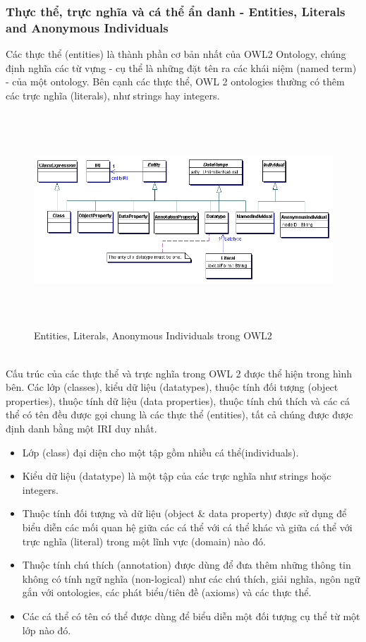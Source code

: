 \subsubsection{Thực thể, trực nghĩa và cá thể ẩn danh - Entities, Literals and Anonymous Individuals}
Các thực thể (entities) là thành phần cơ bản nhất của OWL2 Ontology, chúng định nghĩa các từ vựng - cụ thể là những đặt tên ra các khái niệm (named term) - của một ontology. Bên cạnh các thực thể, OWL 2 ontologies thường có thêm các trực nghĩa (literals), như strings hay integers.
\begin{figure}[ht!]
	\centering
	\includegraphics[width=150mm, height=80mm]{Figures/entities.png}
	\caption{Entities, Literals, Anonymous Individuals trong OWL2 \label{overflow}}
\end{figure}
\\
Cấu trúc của các thực thể và trực nghĩa trong OWL 2 được thể hiện trong hình bên. Các lớp (classes), kiểu dữ liệu (datatypes), thuộc tính đối tượng (object properties), thuộc tính dữ liệu (data properties), thuộc tính chú thích và các cá thể có tên đều được gọi chung là các thực thể (entities), tất cả chúng được được định danh bằng một IRI duy nhất. 
\begin{itemize}
	\item Lớp (class) đại diện cho một tập gồm nhiều cá thể(individuals).
	\item Kiểu dữ liệu (datatype) là một tập của các trực nghĩa như strings hoặc integers.
	\item Thuộc tính đối tượng và dữ liệu (object \& data property) được sử dụng để biểu diễn các mối quan hệ giữa các cá thể với cá thể khác và giữa cá thể với trực nghĩa (literal) trong một lĩnh vực (domain) nào đó.
	\item Thuộc tính chú thích (annotation) được dùng để đưa thêm những thông tin không có tính ngữ nghĩa (non-logical) như các chú thích, giải nghĩa, ngôn ngữ gắn với ontologies, các phát biểu/tiên đề (axioms) và các thực thể.
	\item  Các cá thể có tên có thể được dùng để biểu diễn một đối tượng cụ thể từ một lớp nào đó.
\end{itemize}
